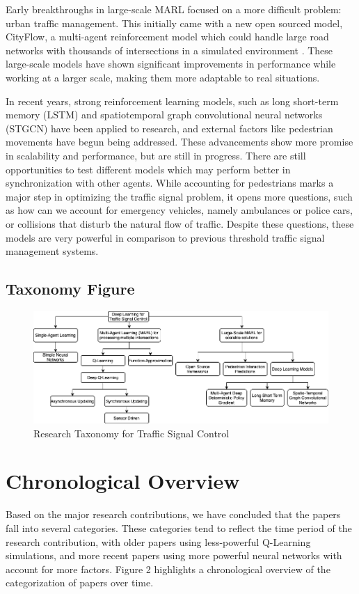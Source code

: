 \documentclass[conference]{IEEEtran}
\begin{document}
Early breakthroughs in large-scale MARL focused on a more difficult problem: urban traffic management. This initially came with a new open sourced model, CityFlow, a multi-agent reinforcement model which could handle large road networks with thousands of intersections in a simulated environment \cite{7}. These large-scale models have shown significant improvements in performance while working at a larger scale, making them more adaptable to real situations. 

In recent years, strong reinforcement learning models, such as long short-term memory (LSTM) and spatiotemporal graph convolutional neural networks (STGCN) have been applied to research, and external factors like pedestrian movements have begun being addressed. These advancements show more promise in scalability and performance, but are still in progress. There are still opportunities to test different models which may perform better in synchronization with other agents. While accounting for pedestrians marks a major step in optimizing the traffic signal problem, it opens more questions, such as how can we account for emergency vehicles, namely ambulances or police cars, or collisions that disturb the natural flow of traffic. Despite these questions, these models are very powerful in comparison to previous threshold traffic signal management systems. 

\subsection{Taxonomy Figure}

\begin{figure}[H]
    \centering
    \includegraphics[width=0.9\linewidth]{Research Taxonomy.png}
    \caption{Research Taxonomy for Traffic Signal Control}
\end{figure}


\section{Chronological Overview}
Based on the major research contributions, we have concluded that the papers fall into several categories. These categories tend to reflect the time period of the research contribution, with older papers using less-powerful Q-Learning simulations, and more recent papers using more powerful neural networks with account for more factors. Figure 2 highlights a chronological overview of the categorization of papers over time. 
\end{document}
